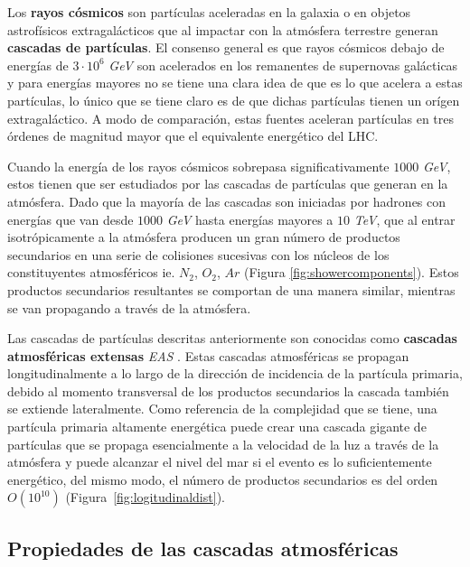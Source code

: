 Los \textbf{rayos cósmicos} son partículas aceleradas en la galaxia o en objetos astrofísicos extragalácticos que al impactar con la atmósfera terrestre generan \textbf{cascadas de partículas}. El consenso general es que rayos cósmicos debajo de energías de $3\cdot 10^6$ \textit{GeV} son acelerados en los remanentes de supernovas galácticas y para energías mayores no se tiene una clara idea de que es lo que acelera a estas partículas, lo único que se tiene claro es de que dichas partículas tienen un orígen extragaláctico. A modo de comparación, estas fuentes aceleran partículas en tres órdenes de magnitud mayor que el equivalente energético del LHC.

Cuando la energía de los rayos cósmicos sobrepasa significativamente $1000$ \textit{GeV}, estos tienen que ser estudiados por las cascadas de partículas que generan en la atmósfera. Dado que la mayoría de las cascadas son iniciadas por hadrones con energías que van desde $1000$  \textit{GeV} hasta energías mayores a $10$ \textit{TeV}, que al entrar isotrópicamente a la atmósfera producen un gran número de productos secundarios en una serie de colisiones sucesivas con los núcleos de los constituyentes atmosféricos ie. $N_2$, $O_2$, $Ar$ (Figura \ref{fig:showercomponents}). Estos productos secundarios resultantes se comportan de una manera similar, mientras se van propagando a través de la atmósfera.

Las cascadas de partículas descritas anteriormente son conocidas como \textbf{cascadas atmosféricas extensas} \emph{EAS} \parencite{GriederEAS2010}. Estas cascadas atmosféricas se propagan longitudinalmente a lo largo de la dirección de incidencia de la partícula primaria, debido al momento transversal de los productos secundarios la cascada también se extiende lateralmente. Como referencia de la complejidad que se tiene, una partícula primaria altamente energética puede crear una cascada gigante de partículas que se propaga esencialmente a la velocidad de la luz a través de la atmósfera y puede alcanzar el nivel del mar si el evento es lo suficientemente energético, del mismo modo, el número de productos secundarios es del orden $O(10^10)$ (Figura~\ref{fig:logitudinaldist}).


\subsection{Propiedades de las cascadas atmosféricas}

